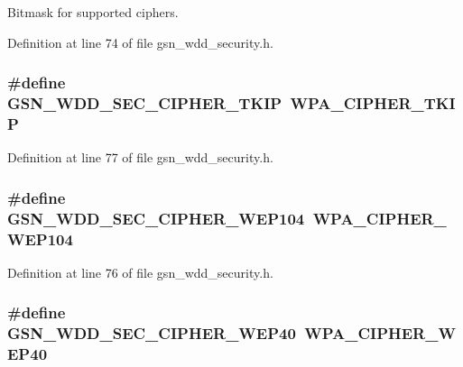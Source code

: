 Bitmask for supported ciphers. 



Definition at line 74 of file gsn\_\-wdd\_\-security.h.

\hypertarget{a00604_a48db4b5683dca1d4d74573b6cd1a1380}{
\subsubsection[{GSN\_\-WDD\_\-SEC\_\-CIPHER\_\-TKIP}]{\setlength{\rightskip}{0pt plus 5cm}\#define GSN\_\-WDD\_\-SEC\_\-CIPHER\_\-TKIP~WPA\_\-CIPHER\_\-TKIP}}
\label{a00604_a48db4b5683dca1d4d74573b6cd1a1380}


Definition at line 77 of file gsn\_\-wdd\_\-security.h.

\hypertarget{a00604_a75410ead00825fdb1501f9559cb0e96f}{
\subsubsection[{GSN\_\-WDD\_\-SEC\_\-CIPHER\_\-WEP104}]{\setlength{\rightskip}{0pt plus 5cm}\#define GSN\_\-WDD\_\-SEC\_\-CIPHER\_\-WEP104~WPA\_\-CIPHER\_\-WEP104}}
\label{a00604_a75410ead00825fdb1501f9559cb0e96f}


Definition at line 76 of file gsn\_\-wdd\_\-security.h.

\hypertarget{a00604_ad934eadbb32639568234455fb01545b5}{
\subsubsection[{GSN\_\-WDD\_\-SEC\_\-CIPHER\_\-WEP40}]{\setlength{\rightskip}{0pt plus 5cm}\#define GSN\_\-WDD\_\-SEC\_\-CIPHER\_\-WEP40~WPA\_\-CIPHER\_\-WEP40}}
\label{a00604_ad934eadbb32639568234455fb01545b5}



